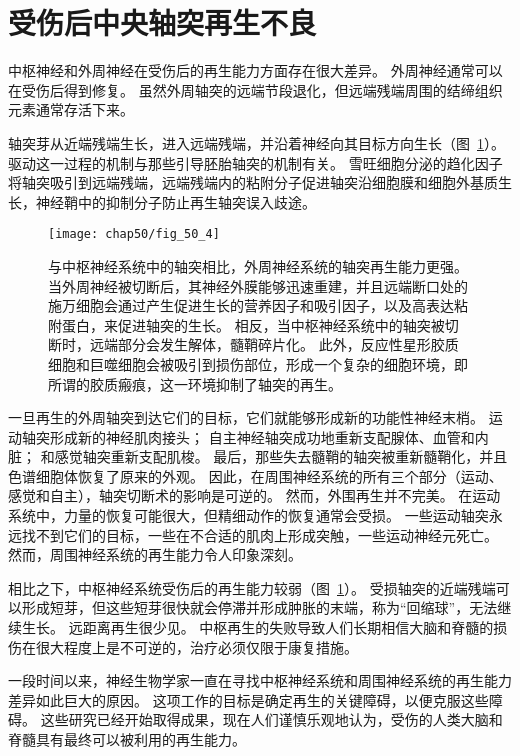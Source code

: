 \section{受伤后中央轴突再生不良}

中枢神经和外周神经在受伤后的再生能力方面存在很大差异。
外周神经通常可以在受伤后得到修复。
虽然外周轴突的远端节段退化，但远端残端周围的结缔组织元素通常存活下来。


轴突芽从近端残端生长，进入远端残端，并沿着神经向其目标方向生长（图~\ref{fig:50_4}）。
驱动这一过程的机制与那些引导胚胎轴突的机制有关。 雪旺细胞分泌的趋化因子将轴突吸引到远端残端，远端残端内的粘附分子促进轴突沿细胞膜和细胞外基质生长，神经鞘中的抑制分子防止再生轴突误入歧途。


\begin{figure}[htbp]
	\centering
	\texttt{[image: chap50/fig\_50\_4]}
	\caption{与中枢神经系统中的轴突相比，外周神经系统的轴突再生能力更强。
		当外周神经被切断后，其神经外膜能够迅速重建，并且远端断口处的施万细胞会通过产生促进生长的营养因子和吸引因子，以及高表达粘附蛋白，来促进轴突的生长。
		相反，当中枢神经系统中的轴突被切断时，远端部分会发生解体，髓鞘碎片化。
		此外，反应性星形胶质细胞和巨噬细胞会被吸引到损伤部位，形成一个复杂的细胞环境，即所谓的胶质瘢痕，这一环境抑制了轴突的再生。 }
	\label{fig:50_4}
\end{figure}


一旦再生的外周轴突到达它们的目标，它们就能够形成新的功能性神经末梢。
运动轴突形成新的神经肌肉接头；
自主神经轴突成功地重新支配腺体、血管和内脏；
和感觉轴突重新支配肌梭。
最后，那些失去髓鞘的轴突被重新髓鞘化，并且色谱细胞体恢复了原来的外观。
因此，在周围神经系统的所有三个部分（运动、感觉和自主），轴突切断术的影响是可逆的。
然而，外围再生并不完美。
在运动系统中，力量的恢复可能很大，但精细动作的恢复通常会受损。
一些运动轴突永远找不到它们的目标，一些在不合适的肌肉上形成突触，一些运动神经元死亡。
然而，周围神经系统的再生能力令人印象深刻。


相比之下，中枢神经系统受伤后的再生能力较弱（图~\ref{fig:50_4}）。
受损轴突的近端残端可以形成短芽，但这些短芽很快就会停滞并形成肿胀的末端，称为“回缩球”，无法继续生长。
远距离再生很少见。
中枢再生的失败导致人们长期相信大脑和脊髓的损伤在很大程度上是不可逆的，治疗必须仅限于康复措施。


一段时间以来，神经生物学家一直在寻找中枢神经系统和周围神经系统的再生能力差异如此巨大的原因。
这项工作的目标是确定再生的关键障碍，以便克服这些障碍。
这些研究已经开始取得成果，现在人们谨慎乐观地认为，受伤的人类大脑和脊髓具有最终可以被利用的再生能力。


